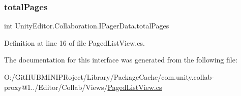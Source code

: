 \subsubsection{\texorpdfstring{totalPages}{totalPages}}
{\footnotesize\ttfamily int Unity\+Editor.\+Collaboration.\+I\+Pager\+Data.\+total\+Pages\hspace{0.3cm}{\ttfamily [get]}}



Definition at line 16 of file Paged\+List\+View.\+cs.



The documentation for this interface was generated from the following file\+:\begin{DoxyCompactItemize}
\item 
O\+:/\+Git\+H\+U\+B\+M\+I\+N\+I\+P\+Roject/\+Library/\+Package\+Cache/com.\+unity.\+collab-\/proxy@1../\+Editor/\+Collab/\+Views/\mbox{\hyperlink{_paged_list_view_8cs}{Paged\+List\+View.\+cs}}\end{DoxyCompactItemize}
